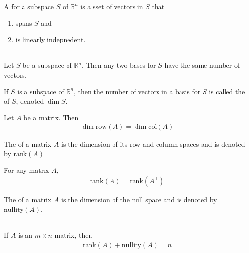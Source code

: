 \documentclass{article}
\begin{document}
\begin{definition}
    A  for a subspace $S$ of $\mathbb{R}^n$ is a sset of vectors in $S$ that
    \begin{enumerate}
        \item spans $S$ and
        \item is linearly indepnedent.
    \end{enumerate}
\end{definition}
\begin{theorem}
    \\
    Let $S$ be a subspace of $\mathbb{R}^n$. Then any two bases for $S$ have the same number of vectors.
\end{theorem}
\begin{definition}
    If $S$ is a subspace of $\mathbb{R}^n$, then the number of vectors in a basis for $S$ is called the  of $S$, denoted $\dim S$.
\end{definition}
\begin{theorem}
    Let $A$ be a matrix. Then
    \begin{gather*}
        \dim \text{row}(A) = \dim \text{col}(A)
    \end{gather*}
\end{theorem}
\begin{definition}
    The  of a matrix $A$ is the dimension of its row and column spaces and is denoted by $\text{rank}(A)$.
\end{definition}
\begin{theorem}
    For any matrix $A$,
    \begin{gather*}
        \text{rank}(A) = \text{rank}(A^\intercal)
    \end{gather*}
\end{theorem}
\begin{definition}
    The  of a matrix $A$ is the dimension of the null space and is denoted by $\text{nullity}(A)$.
\end{definition}
\begin{theorem}
    \\
    If $A$ is an $m\times n$ matrix, then
    \begin{gather*}
        \text{rank}(A) + \text{nullity}(A) = n
    \end{gather*}
\end{theorem}
\end{document}
